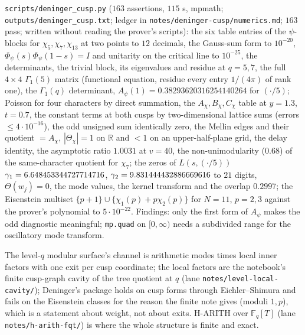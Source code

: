 \begin{numerical}
\label{num:deninger-cusp}
\texttt{scripts/deninger\_cusp.py} ($163$ assertions, $115$ s, mpmath; \texttt{outputs/deninger\_cusp.txt}; ledger in
\texttt{notes/deninger-cusp/numerics.md}; $163$ pass; written without reading the prover's scripts): the six table entries
of the $\psi$-blocks for $\chi_5,\chi_7,\chi_{13}$ at two points to $12$ decimals, the Gauss-sum form to $10^{-20}$,
$\Phi_\psi(s)\Phi_\psi(1-s) = I$ and unitarity on the critical line to $10^{-25}$, the determinants, the trivial block, its
eigenvalues and residue at $q = 5,7$, the full $4\times4$ $\Gamma_1(5)$ matrix (functional equation, residue every entry $1/(4\pi)$
of rank one), the $\Gamma_1(q)$ determinant, $A_\psi(1) = 0.38293620316254140264$ for $(\cdot/5)$; Poisson for four characters by
direct summation, the $A_\chi,B_\chi,C_\chi$ table at $y = 1.3$, $t = 0.7$, the constant terms at both cusps by two-dimensional
lattice sums (errors $\le4\cdot10^{-16}$), the odd unsigned sum identically zero, the Mellin edges and their quotient $= A_\chi$,
$|\Theta_\chi| = 1$ on $\mathbb R$ and $<1$ on an upper-half-plane grid, the delay identity, the asymptotic ratio $1.0031$ at
$v = 40$, the non-unimodularity ($0.68$) of the same-character quotient for $\chi_7$; the zeros of $L(s,(\cdot/5))$
$\gamma_{1} = 6.648453344727714716$, $\gamma_{2} = 9.831444432886669616$ to $21$ digits, $\Theta(w_j) = 0$, the mode values, the kernel
transform and the overlap $0.2997$; the Eisenstein multiset $\{p+1\}\cup\{\chi_1(p)+p\chi_2(p)\}$ for $N = 11$, $p = 2,3$
against the prover's polynomial to $5\cdot10^{-22}$. Findings: only the first form of $A_\psi$ makes the odd diagnostic
meaningful; \texttt{mp.quad} on $[0,\infty)$ needs a subdivided range for the oscillatory mode transform.
\end{numerical}

\begin{observation}
\label{obs:deninger-cusp-next}
The level-$q$ modular surface's channel is arithmetic modes times local inner factors with one exit per cusp coordinate;
the local factors are the notebook's finite cusp-graph cavity of the tree quotient at $q$ (lane
\texttt{notes/level-local-cavity/}); Deninger's package holds on cusp forms through Eichler--Shimura and fails on the
Eisenstein classes for the reason the finite note gives (moduli $1,p$), which is a statement about weight, not about
exits. H-ARITH over $\mathbb F_q[T]$ (lane \texttt{notes/h-arith-fqt/}) is where the whole structure is finite and exact.
\end{observation}
